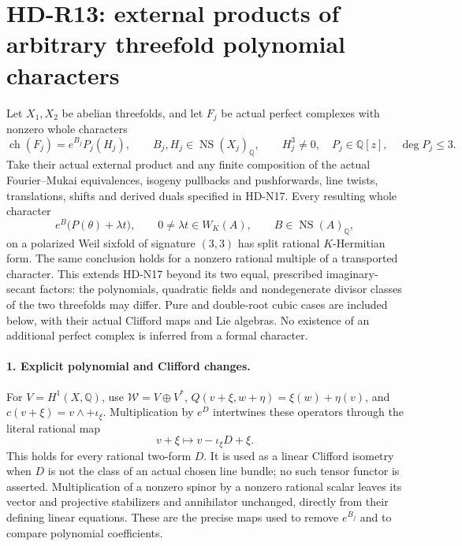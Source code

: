 \section{HD-R13: external products of arbitrary threefold polynomial characters}
\label{sec:threefold-polynomial-products}

Let \(X_1,X_2\) be abelian threefolds, and let \(F_j\) be
actual perfect complexes with nonzero whole characters
\[
 \operatorname{ch}(F_j)=e^{B_j}P_j(H_j),\qquad
 B_j,H_j\in\operatorname{NS}(X_j)_{\mathbb Q},\qquad
 H_j^3\ne0,\quad P_j\in\mathbb Q[z],\quad\deg P_j\le3.
                                                               \tag{R13.1}
\]
Take their actual external product and any finite composition of
the actual Fourier--Mukai equivalences, isogeny pullbacks and
pushforwards, line twists, translations, shifts and derived duals
specified in HD-N17. Every resulting whole character
\[
             e^B\bigl(P(\theta)+\lambda t\bigr),\qquad
 0\ne\lambda t\in W_K(A),\qquad
 B\in\operatorname{NS}(A)_{\mathbb Q},                     \tag{R13.2}
\]
on a polarized Weil sixfold of signature \((3,3)\) has split
rational \(K\)-Hermitian form. The same conclusion holds for
a nonzero rational multiple of a transported character. This
extends HD-N17 beyond its two equal, prescribed imaginary-secant
factors: the polynomials, quadratic fields and nondegenerate
divisor classes of the two threefolds may differ. Pure and
double-root cubic cases are included below, with their actual
Clifford maps and Lie algebras. No existence of an additional
perfect complex is inferred from a formal character.

\paragraph{1. Explicit polynomial and Clifford changes.}
For \(V=H^1(X,\mathbb Q)\), use
\(\mathcal W=V\oplus V^*\),
\(Q(v+\xi,w+\eta)=\xi(w)+\eta(v)\), and
\(c(v+\xi)=v\wedge+\iota_\xi\). Multiplication by \(e^D\)
intertwines these operators through the literal rational map
\[
        v+\xi\longmapsto v-\iota_\xi D+\xi.                \tag{R13.3}
\]
This holds for every rational two-form \(D\). It is used as a
linear Clifford isometry when \(D\) is not the class of an
actual chosen line bundle; no such tensor functor is asserted.
Multiplication of a nonzero spinor by a nonzero rational scalar
leaves its vector and projective stabilizers and annihilator
unchanged, directly from their defining linear equations.
These are the precise maps used to remove \(e^{B_j}\) and
to compare polynomial coefficients.


